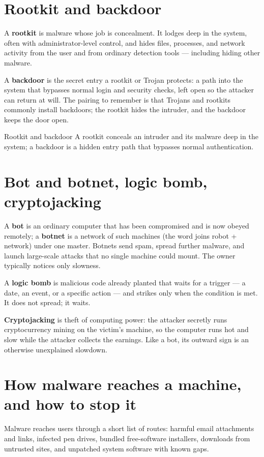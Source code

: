 \section{Rootkit and backdoor}
A \textbf{rootkit} is malware whose job is concealment. It lodges deep in
the system, often with administrator-level control, and hides files,
processes, and network activity from the user and from ordinary detection
tools --- including hiding other malware.

A \textbf{backdoor} is the secret entry a rootkit or Trojan protects: a
path into the system that bypasses normal login and security checks, left
open so the attacker can return at will. The pairing to remember is that
Trojans and rootkits commonly install backdoors; the rootkit hides the
intruder, and the backdoor keeps the door open.

\begin{definitionbox}{Rootkit and backdoor}
A rootkit conceals an intruder and its malware deep in the system; a
backdoor is a hidden entry path that bypasses normal authentication.
\end{definitionbox}

\section{Bot and botnet, logic bomb, cryptojacking}
A \textbf{bot} is an ordinary computer that has been compromised and is now
obeyed remotely; a \textbf{botnet} is a network of such machines (the word
joins robot + network) under one master. Botnets send spam, spread further
malware, and launch large-scale attacks that no single machine could mount.
The owner typically notices only slowness.

A \textbf{logic bomb} is malicious code already planted that waits for a
trigger --- a date, an event, or a specific action --- and strikes only when
the condition is met. It does not spread; it waits.

\textbf{Cryptojacking} is theft of computing power: the attacker secretly
runs cryptocurrency mining on the victim's machine, so the computer runs hot
and slow while the attacker collects the earnings. Like a bot, its outward
sign is an otherwise unexplained slowdown.

\section{How malware reaches a machine, and how to stop it}
Malware reaches users through a short list of routes: harmful email
attachments and links, infected pen drives, bundled free-software
installers, downloads from untrusted sites, and unpatched system software
with known gaps.

